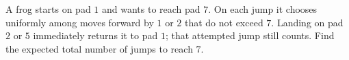 A frog starts on pad $1$ and wants to reach pad $7$. On each jump it chooses uniformly among moves forward by $1$ or $2$ that do not exceed $7$. Landing on pad $2$ or $5$ immediately returns it to pad $1$; that attempted jump still counts. Find the expected total number of jumps to reach $7$.
